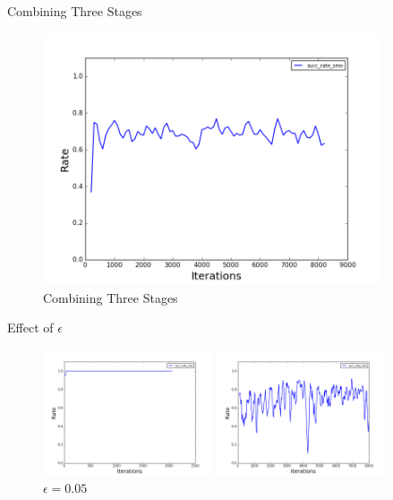 \documentclass{beamer}
\begin{document}
\begin{frame}{Combining Three Stages}
\begin{figure}
    \centering
    \includegraphics[width=10cm]{whole_sim.png}
    \caption{Combining Three Stages}
    \label{fig:Combining Three Stages}
\end{figure}
\end{frame}

\begin{frame}{Effect of $\epsilon$}
\begin{figure}
    \centering
    \begin{minipage}{5cm}
    \includegraphics[width=5cm]{0.png}
    \caption{$\epsilon = 0$}
    \end{minipage}
    \begin{minipage}{5cm}
    \includegraphics[width=5cm]{0_05.png}
    \caption{$\epsilon = 0.05$}
    \end{minipage}
\end{figure} 
\end{frame}
\end{document}
